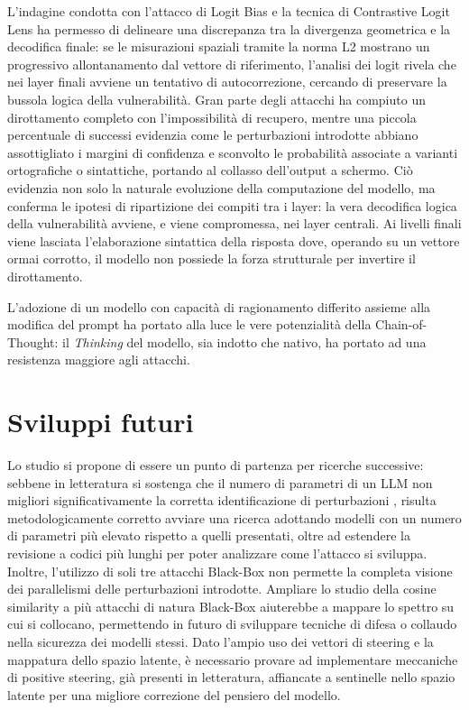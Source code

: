L'indagine condotta con l'attacco di Logit Bias e la tecnica di Contrastive Logit Lens ha permesso di delineare una discrepanza tra la divergenza geometrica e la decodifica finale: se le misurazioni spaziali tramite la norma L2 mostrano un progressivo allontanamento dal vettore di riferimento, l'analisi dei logit rivela che nei layer finali avviene un tentativo di autocorrezione, cercando di preservare la bussola logica della vulnerabilità. Gran parte degli attacchi ha compiuto un dirottamento completo con l'impossibilità di recupero, mentre una piccola percentuale di successi evidenzia come le perturbazioni introdotte abbiano assottigliato i margini di confidenza e sconvolto le probabilità associate a varianti ortografiche o sintattiche, portando al collasso dell'output a schermo.
Ciò evidenzia non solo la naturale evoluzione della computazione del modello, ma conferma le ipotesi di ripartizione dei compiti tra i layer: la vera decodifica logica della vulnerabilità avviene, e viene compromessa, nei layer centrali. Ai livelli finali viene lasciata l'elaborazione sintattica della risposta dove, operando su un vettore ormai corrotto, il modello non possiede la forza strutturale per invertire il dirottamento.

L'adozione di un modello con capacità di ragionamento differito assieme alla modifica del prompt ha portato alla luce le vere potenzialità della Chain-of-Thought: il \textit{Thinking} del modello, sia indotto che nativo, ha portato ad una resistenza maggiore agli attacchi.

\section{Sviluppi futuri}
Lo studio si propone di essere un punto di partenza per ricerche successive: sebbene in letteratura si sostenga che il numero di parametri di un LLM non migliori significativamente la corretta identificazione di perturbazioni \cite{steenhoek2025errmachinevulnerabilitydetection}, risulta metodologicamente corretto avviare una ricerca adottando modelli con un numero di parametri più elevato rispetto a quelli presentati, oltre ad estendere la revisione a codici più lunghi per poter analizzare come l'attacco si sviluppa.
Inoltre, l'utilizzo di soli tre attacchi Black-Box non permette la completa visione dei parallelismi delle perturbazioni introdotte. Ampliare lo studio della cosine similarity a più attacchi di natura Black-Box aiuterebbe a mappare lo spettro su cui si collocano, permettendo in futuro di sviluppare tecniche di difesa o collaudo nella sicurezza dei modelli stessi.
Dato l'ampio uso dei vettori di steering e la mappatura dello spazio latente, è necessario provare ad implementare meccaniche di positive steering, già presenti in letteratura, affiancate a sentinelle nello spazio latente per una migliore correzione del pensiero del modello.